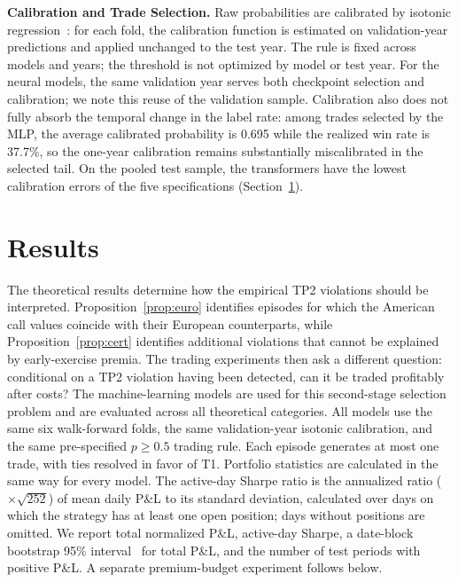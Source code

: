 \documentclass[sigconf,review]{acmart}
\begin{document}
\smallskip\noindent\textbf{Calibration and Trade Selection.}
\label{sec:calibration}
Raw probabilities are calibrated by isotonic regression~\cite{zadrozny2002transforming}: for each fold, the calibration function is estimated on validation-year predictions and applied unchanged to the test year. The rule is fixed across models and years; the threshold is not optimized by model or test year.
For the neural models, the same validation year serves both checkpoint selection and calibration; we note this reuse of the validation sample. Calibration also does not fully absorb the temporal change in the label rate: among trades selected by the MLP, the average calibrated probability is 0.695 while the realized win rate is 37.7\%, so the one-year calibration remains substantially miscalibrated in the selected tail. On the pooled test sample, the transformers have the lowest calibration errors of the five specifications (Section~\ref{sec:results}).

\section{Results}
\label{sec:results}

The theoretical results determine how the empirical TP2 violations should be interpreted. Proposition~\ref{prop:euro} identifies episodes for which the American call values coincide with their European counterparts, while Proposition~\ref{prop:cert} identifies additional violations that cannot be explained by early-exercise premia. The trading experiments then ask a different question: conditional on a TP2 violation having been detected, can it be traded profitably after costs? The machine-learning models are used for this second-stage selection problem and are evaluated across all theoretical categories.
All models use the same six walk-forward folds, the same validation-year isotonic calibration, and the same pre-specified $p\ge0.5$ trading rule. Each episode generates at most one trade, with ties resolved in favor of T1. Portfolio statistics are calculated in the same way for every model. The active-day Sharpe ratio is the annualized ratio ($\times\sqrt{252}$) of mean daily P\&L to its standard deviation, calculated over days on which the strategy has at least one open position; days without positions are omitted. We report total normalized P\&L, active-day Sharpe, a date-block bootstrap 95\% interval~\cite{kunsch1989} for total P\&L, and the number of test periods with positive P\&L. A separate premium-budget experiment follows below.
\end{document}
